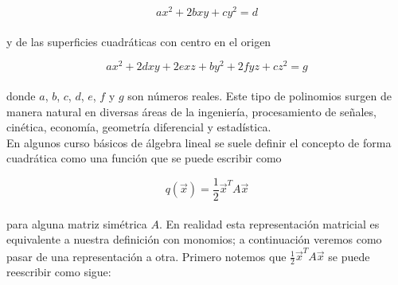 \begin{equation*}
ax^{2} + 2bxy + cy^{2} = d
\end{equation*}

\paragraph*{}
y de las superficies cuadráticas con centro en el origen

\begin{equation*}
ax^{2} + 2dxy + 2exz + by^{2} + 2fyz + cz^{2} = g
\end{equation*}

\paragraph*{}
donde $a$, $b$, $c$, $d$, $e$, $f$ y $g$ son números reales. Este tipo de polinomios surgen de manera natural en diversas áreas de la ingeniería, procesamiento de señales, cinética, economía, geometría diferencial y estadística.\\
En algunos curso básicos de álgebra lineal se suele definir el concepto de forma cuadrática como una función que se puede escribir como

\begin{equation*}
q(\overrightarrow{x}) = \frac{1}{2} \overrightarrow{x}^{T} A \overrightarrow{x}
\end{equation*}

\paragraph*{}
para alguna matriz simétrica $A$. En realidad esta representación matricial es equivalente a nuestra definición con monomios; a continuación veremos como pasar de una representación a otra. Primero notemos que $\frac{1}{2} \overrightarrow{x}^{T} A \overrightarrow{x}$ se puede reescribir como sigue:


